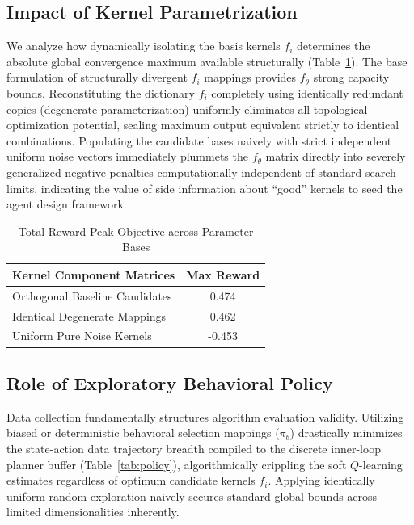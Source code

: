 \documentclass[12pt]{article}
\renewcommand{\[}{\left[}
\renewcommand{\]}{\right]}
\renewcommand{\(}{\left(}
\renewcommand{\)}{\right)}
\newcounter{l1}
\newcounter{l2}
\newcounter{l3}
\begin{document}
\subsection{Impact of Kernel Parametrization}
We analyze how dynamically isolating the basis kernels $f_i$ determines the absolute global convergence maximum available structurally (Table~\ref{tab:kernels}). The base formulation of structurally divergent $f_i$ mappings provides $f_\theta$ strong capacity bounds. Reconstituting the dictionary $f_i$ completely using identically redundant copies (degenerate parameterization) uniformly eliminates all topological optimization potential, sealing maximum output equivalent strictly to identical combinations. Populating the candidate bases naively with strict independent uniform noise vectors immediately plummets the $f_\theta$ matrix directly into severely generalized negative penalties computationally independent of standard search limits, indicating the value of side information about ``good'' kernels to seed the agent design framework.

\begin{table}[h]
    \centering
    \caption{Total Reward Peak Objective across Parameter Bases}
    \begin{tabular}{lc}
        \hline
        \textbf{Kernel Component Matrices} & \textbf{Max Reward} \\ \hline
        Orthogonal Baseline Candidates  & 0.474 \\
        Identical Degenerate Mappings   & 0.462 \\
        Uniform Pure Noise Kernels      & -0.453 \\ \hline
    \end{tabular}
    \label{tab:kernels}
\end{table}

\subsection{Role of Exploratory Behavioral Policy}
Data collection fundamentally structures algorithm evaluation validity. Utilizing biased or deterministic behavioral selection mappings ($\pi_b$) drastically minimizes the state-action data trajectory breadth compiled to the discrete inner-loop planner buffer (Table~\ref{tab:policy}), algorithmically crippling the soft $Q$-learning estimates regardless of optimum candidate kernels $f_i$. Applying identically uniform random exploration naively secures standard global bounds across limited dimensionalities inherently.
\end{document}
